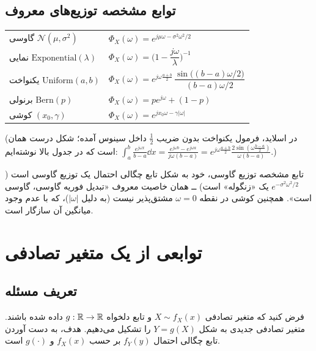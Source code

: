 \subsection{توابع مشخصه توزیع‌های معروف}
\begin{center}
\renewcommand{\arraystretch}{1.8}
\begin{tabular}{l|l}
گاوسی $\mathcal N(\mu,\sigma^2)$ & $\Phi_X(\omega)=e^{j\mu\omega-\sigma^2\omega^2/2}$\\
نمایی $\mathrm{Exponential}(\lambda)$ & $\Phi_X(\omega)=\Big(1-\dfrac{j\omega}{\lambda}\Big)^{-1}$\\
یکنواخت $\mathrm{Uniform}(a,b)$ & $\Phi_X(\omega)=e^{j\omega\frac{a+b}{2}}\,\dfrac{\sin\big((b-a)\omega/2\big)}{(b-a)\omega/2}$\\
برنولی $\mathrm{Bern}(p)$ & $\Phi_X(\omega)=pe^{j\omega}+(1-p)$\\
کوشی $(x_0,\gamma)$ & $\Phi_X(\omega)=e^{jx_0\omega-\gamma|\omega|}$
\end{tabular}
\end{center}
\begin{note}
\notetitle (در اسلاید، فرمول یکنواخت بدون ضریب $\frac12$ داخل سینوس آمده؛ شکل درست همان است که در جدول بالا نوشته‌ایم: $\int_a^b\frac{e^{j\omega x}}{b-a}\dd x=\frac{e^{j\omega b}-e^{j\omega a}}{j\omega(b-a)}=e^{j\omega\frac{a+b}2}\frac{2\sin(\omega\frac{b-a}2)}{\omega(b-a)}$.)

تابع مشخصه \textcolor{red!70!black}{توزیع گاوسی}، خود به شکل تابع چگالی احتمال یک \textcolor{red!70!black}{توزیع گاوسی} است ($e^{-\sigma^2\omega^2/2}$ یک «زنگوله» است) ــ همان خاصیت معروف «تبدیل فوریه گاوسی، گاوسی است». همچنین کوشی در نقطه $\omega=0$ مشتق‌پذیر نیست (به دلیل $|\omega|$)، که با عدم وجود میانگین آن سازگار است.
\end{note}

\section{توابعی از یک متغیر تصادفی}

\subsection{تعریف مسئله}
فرض کنید که متغیر تصادفی $X\sim f_X(x)$ و تابع دلخواه $g:\mathbb{R}\to\mathbb{R}$ داده شده باشند. متغیر تصادفی جدیدی به شکل $Y=g(X)$ را تشکیل می‌دهیم. هدف، به دست آوردن \textcolor{red!70!black}{تابع چگالی احتمال $f_Y(y)$} بر حسب $f_X(x)$ و $g(\cdot)$ است.

